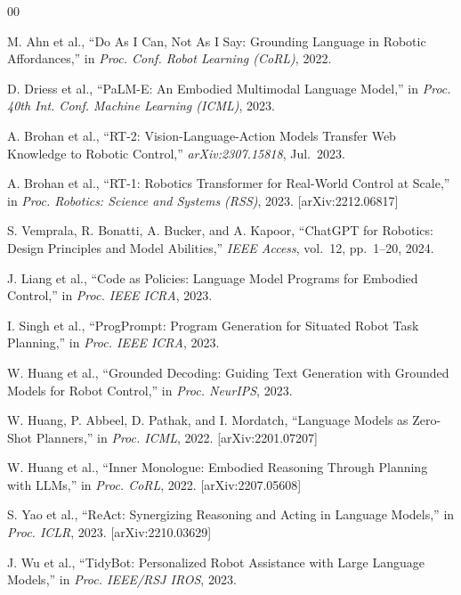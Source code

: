 \documentclass[conference]{IEEEtran}
\begin{document}
\begin{thebibliography}{00}

M. Ahn et al.,
``Do As I Can, Not As I Say: Grounding Language in Robotic Affordances,''
in \textit{Proc. Conf. Robot Learning (CoRL)}, 2022.

D. Driess et al.,
``PaLM-E: An Embodied Multimodal Language Model,''
in \textit{Proc. 40th Int. Conf. Machine Learning (ICML)}, 2023.

A. Brohan et al.,
``RT-2: Vision-Language-Action Models Transfer Web Knowledge to
Robotic Control,'' \textit{arXiv:2307.15818}, Jul.\ 2023.

A. Brohan et al.,
``RT-1: Robotics Transformer for Real-World Control at Scale,''
in \textit{Proc. Robotics: Science and Systems (RSS)}, 2023.
[arXiv:2212.06817]

S. Vemprala, R. Bonatti, A. Bucker, and A. Kapoor,
``ChatGPT for Robotics: Design Principles and Model Abilities,''
\textit{IEEE Access}, vol.~12, pp.~1--20, 2024.

J. Liang et al.,
``Code as Policies: Language Model Programs for Embodied Control,''
in \textit{Proc. IEEE ICRA}, 2023.

I. Singh et al.,
``ProgPrompt: Program Generation for Situated Robot Task Planning,''
in \textit{Proc. IEEE ICRA}, 2023.

W. Huang et al.,
``Grounded Decoding: Guiding Text Generation with Grounded Models for
Robot Control,''
in \textit{Proc. NeurIPS}, 2023.

W. Huang, P. Abbeel, D. Pathak, and I. Mordatch,
``Language Models as Zero-Shot Planners,''
in \textit{Proc. ICML}, 2022. [arXiv:2201.07207]

W. Huang et al.,
``Inner Monologue: Embodied Reasoning Through Planning with LLMs,''
in \textit{Proc. CoRL}, 2022. [arXiv:2207.05608]

S. Yao et al.,
``ReAct: Synergizing Reasoning and Acting in Language Models,''
in \textit{Proc. ICLR}, 2023. [arXiv:2210.03629]

J. Wu et al.,
``TidyBot: Personalized Robot Assistance with Large Language Models,''
in \textit{Proc. IEEE/RSJ IROS}, 2023.


\end{thebibliography}
\end{document}
